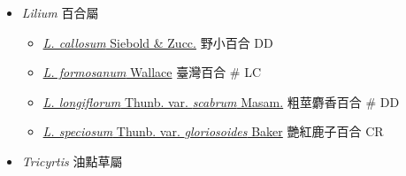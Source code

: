 
  \begin{itemize}
 \item[] \textit{Lilium} 百合屬
                                
  \begin{itemize}
        \item[] \href{http://www.theplantlist.org/tpl1.1/search?q=Lilium+callosum}{\textit{L. callosum} Siebold \& Zucc.}   野小百合   DD
        \item[] \href{http://www.theplantlist.org/tpl1.1/search?q=Lilium+formosanum}{\textit{L. formosanum} Wallace}   臺灣百合  \# LC
        \item[] \href{http://www.theplantlist.org/tpl1.1/search?q=Lilium+longiflorum+var.+scabrum}{\textit{L. longiflorum} Thunb. var. \textit{scabrum} Masam.}   粗莖麝香百合  \# DD
        \item[] \href{http://www.theplantlist.org/tpl1.1/search?q=Lilium+speciosum+var.+gloriosoides}{\textit{L. speciosum} Thunb. var. \textit{gloriosoides} Baker}   艷紅鹿子百合   CR
  \end{itemize}
 \item[] \textit{Tricyrtis} 油點草屬
                                

\end{itemize}
